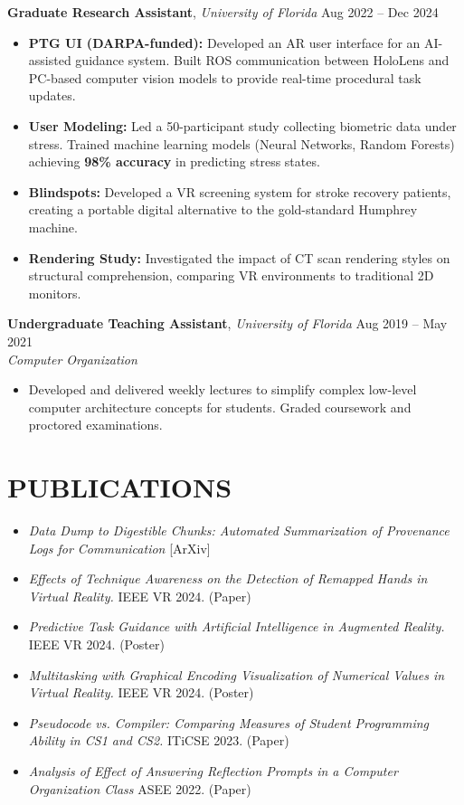 \documentclass[10pt, letterpaper]{article}
\begin{document}
\noindent \textbf{Graduate Research Assistant}, \textit{University of Florida} \hfill Aug 2022 -- Dec 2024
\begin{itemize}
    \item \textbf{PTG UI (DARPA-funded):} Developed an AR user interface for an AI-assisted guidance system. Built ROS communication between HoloLens and PC-based computer vision models to provide real-time procedural task updates.
    \item \textbf{User Modeling:} Led a 50-participant study collecting biometric data under stress. Trained machine learning models (Neural Networks, Random Forests) achieving \textbf{98\% accuracy} in predicting stress states.
    \item \textbf{Blindspots:} Developed a VR screening system for stroke recovery patients, creating a portable digital alternative to the gold-standard Humphrey machine.
    \item \textbf{Rendering Study:} Investigated the impact of CT scan rendering styles on structural comprehension, comparing VR environments to traditional 2D monitors.
\end{itemize}

\vspace{0.2cm}

\noindent \textbf{Undergraduate Teaching Assistant}, \textit{University of Florida} \hfill Aug 2019 -- May 2021 \\
\textit{Computer Organization}
\begin{itemize}
    \item Developed and delivered weekly lectures to simplify complex low-level computer architecture concepts for students. Graded coursework and proctored examinations.
\end{itemize}

\section{PUBLICATIONS}
\begin{itemize}
    \item\textit{Data Dump to Digestible Chunks: Automated Summarization of Provenance Logs for Communication} [ArXiv]
    \item \textit{Effects of Technique Awareness on the Detection of Remapped Hands in Virtual Reality.} IEEE VR 2024. (Paper)
    \item \textit{Predictive Task Guidance with Artificial Intelligence in Augmented Reality.} IEEE VR 2024. (Poster)
    \item \textit{Multitasking with Graphical Encoding Visualization of Numerical Values in Virtual Reality.} IEEE VR 2024. (Poster)
    \item \textit{Pseudocode vs. Compiler: Comparing Measures of Student Programming Ability in CS1 and CS2.} ITiCSE 2023. (Paper)
    \item \textit{Analysis of Effect of Answering Reflection Prompts in a Computer Organization Class} ASEE 2022. (Paper)
\end{itemize}
\end{document}
